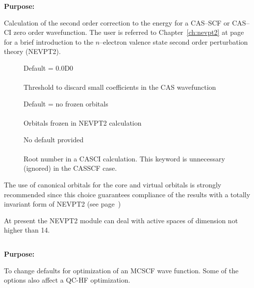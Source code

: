 {\bf Purpose:}

Calculation of the second order correction to the energy for a
CAS--SCF or CAS--CI zero order wavefunction.
The user is referred to Chapter~\ref{ch:nevpt2} at
page~\pageref{ch:nevpt2}  for a brief
introduction to the $n$--electron valence state second order
perturbation theory (NEVPT2).

\begin{description}
\item[]
 Default = 0.0D0\\
   \\
  Threshold to discard small coefficients in the CAS wavefunction


\item[]
  Default = no frozen orbitals\\
   \\
  Orbitals frozen in NEVPT2 calculation

\item[]
 No default provided\\
 \\
Root number in a CASCI calculation. This keyword is unnecessary
(ignored) in the CASSCF case.
\end{description}





The use of canonical orbitals for the core and virtual orbitals is
strongly recommended since this choice guarantees compliance of the
results with a totally invariant form of NEVPT2 (see page~\pageref{ch:nevpt2})

At present the NEVPT2 module can deal with active spaces of dimension
not higher than 14.


\pagebreak[3]
\subsection{\label{ref-optinp}}

{\bf Purpose:}

To change defaults for optimization of an MCSCF wave function.
Some of the options also affect a QC-HF optimization.

